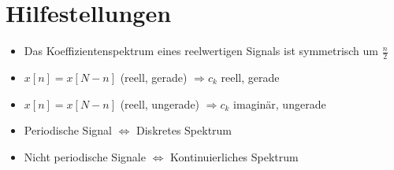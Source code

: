 \documentclass[a4paper, 12pt]{article}
\begin{document}
\section{Hilfestellungen}

\begin{itemize}
    \item Das Koeffizientenspektrum eines reelwertigen Signals ist symmetrisch um
          $\frac{n}{2}$
    \item $x[n] = x[N-n]$ (reell, gerade) $⇒c_k$ reell, gerade
    \item $x[n] = x[N-n]$ (reell, ungerade) $⇒c_k$ imaginär, ungerade
    \item Periodische Signal $⇔$ Diskretes Spektrum
    \item Nicht periodische Signale $⇔$ Kontinuierliches Spektrum
\end{itemize}
\end{document}
